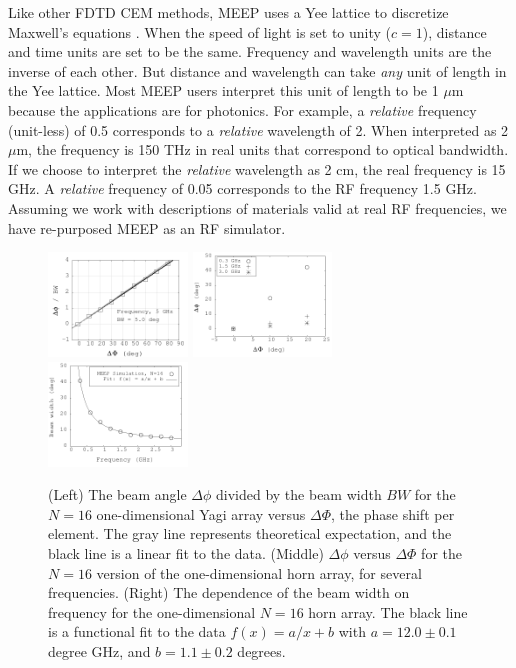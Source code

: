 \documentclass[../../main.tex]{subfiles}
\begin{document}
Like other FDTD CEM methods, MEEP uses a Yee lattice to discretize Maxwell's equations \cite{10.1109/tap.1966.1138693}.  When the speed of light is set to unity ($c = 1$), distance and time units are set to be the same.  Frequency and wavelength units are the inverse of each other.  But distance and wavelength can take \textit{any} unit of length in the Yee lattice.  Most MEEP users interpret this unit of length to be 1 $\mu$m because the applications are for photonics.  For example, a \textit{relative} frequency (unit-less) of 0.5 corresponds to a \textit{relative} wavelength of 2.  When interpreted as 2 $\mu$m, the frequency is 150 THz in real units that correspond to optical bandwidth.  If we choose to interpret the \textit{relative} wavelength as 2 cm, the real frequency is 15 GHz.  A \textit{relative} frequency of 0.05 corresponds to the RF frequency 1.5 GHz.  Assuming we work with descriptions of materials valid at real RF frequencies, we have re-purposed MEEP as an RF simulator.  \\ \vspace{2.5mm}

\begin{figure}
\centering
\includegraphics[width=0.33\textwidth]{figures/Oct30_plot1.png}
\includegraphics[width=0.33\textwidth]{figures/Aug11_plot2.png}
\includegraphics[width=0.33\textwidth]{figures/Aug11_plot1.png}
\caption{\label{fig:pa_1} (Left) The beam angle $\Delta \phi$ divided by the beam width $BW$ for the $N = 16$ one-dimensional Yagi array versus $\Delta \Phi$, the phase shift per element. The gray line represents theoretical expectation, and the black line is a linear fit to the data.  (Middle) $\Delta \phi$ versus $\Delta \Phi$ for the $N=16$ version of the one-dimensional horn array, for several frequencies.  (Right) The dependence of the beam width on frequency for the one-dimensional $N=16$ horn array.  The black line is a functional fit to the data $f(x) = a/x + b$ with $a=12.0\pm 0.1$ degree GHz, and $b=1.1\pm 0.2$ degrees.}
\end{figure}
\end{document}
